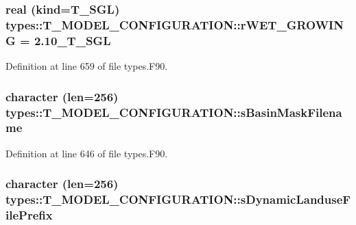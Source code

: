 \hypertarget{typetypes_1_1_t___m_o_d_e_l___c_o_n_f_i_g_u_r_a_t_i_o_n_a4d0ab1616b636849b4dc5d38f7670006}{
\subsubsection[{rWET\_\-GROWING}]{\setlength{\rightskip}{0pt plus 5cm}real (kind={\bf T\_\-SGL}) {\bf types::T\_\-MODEL\_\-CONFIGURATION::rWET\_\-GROWING} = 2.10\_\-T\_\-SGL}}
\label{typetypes_1_1_t___m_o_d_e_l___c_o_n_f_i_g_u_r_a_t_i_o_n_a4d0ab1616b636849b4dc5d38f7670006}


Definition at line 659 of file types.F90.

\hypertarget{typetypes_1_1_t___m_o_d_e_l___c_o_n_f_i_g_u_r_a_t_i_o_n_aa430859b156cb6d8c156238f1bb96bc2}{
\subsubsection[{sBasinMaskFilename}]{\setlength{\rightskip}{0pt plus 5cm}character (len=256) {\bf types::T\_\-MODEL\_\-CONFIGURATION::sBasinMaskFilename}}}
\label{typetypes_1_1_t___m_o_d_e_l___c_o_n_f_i_g_u_r_a_t_i_o_n_aa430859b156cb6d8c156238f1bb96bc2}


Definition at line 646 of file types.F90.

\hypertarget{typetypes_1_1_t___m_o_d_e_l___c_o_n_f_i_g_u_r_a_t_i_o_n_a473e76f0d3217bb761827ab5e19b39ce}{
\subsubsection[{sDynamicLanduseFilePrefix}]{\setlength{\rightskip}{0pt plus 5cm}character (len=256) {\bf types::T\_\-MODEL\_\-CONFIGURATION::sDynamicLanduseFilePrefix}}}
\label{typetypes_1_1_t___m_o_d_e_l___c_o_n_f_i_g_u_r_a_t_i_o_n_a473e76f0d3217bb761827ab5e19b39ce}


